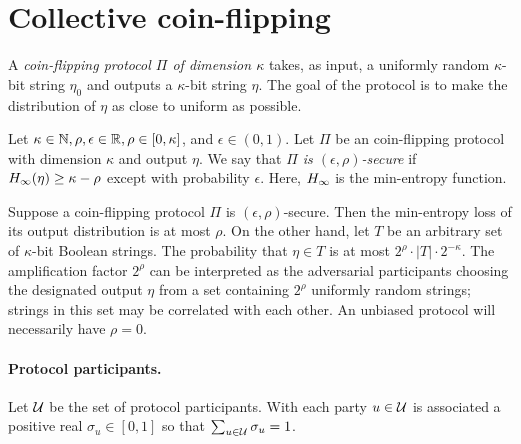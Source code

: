 
\newcommand{\FuncBeacon}{\mathcal{F}_\mathsf{beacon}}
\newcommand{\ProtocolBeacon}{\mathcal{\Pi}_\mathsf{beacon}}




\section{Collective coin-flipping}

    A \emph{coin-flipping protocol $\Pi$ of dimension $\kappa$} 
    takes, as input, a uniformly random $\kappa$-bit string $\eta_0$
    and outputs a $\kappa$-bit string $\eta$. 
    The goal of the protocol is to make the distribution of $\eta$ 
    as close to uniform as possible.
    
    \begin{definition}\label{def:coin-flipping-security}
        Let $\kappa \in \mathbb{N}, \rho, \epsilon \in \mathbb{R}, \rho \in [0, \kappa]$, and $\epsilon \in (0,1)$.
        Let $\Pi$ be an coin-flipping protocol with dimension $\kappa$ 
        and output $\eta$. 
        We say that \emph{$\Pi$ is $(\epsilon, \rho)$-secure} if 
        $H_\infty(\eta) \geq \kappa - \rho$ 
        except with probability $\epsilon$. 
        Here, $H_\infty$ is the min-entropy function.
    \end{definition}
    
    Suppose a coin-flipping protocol $\Pi$ is $(\epsilon, \rho)$-secure. 
    Then 
    the min-entropy loss of its output distribution is at most $\rho$. 
    On the other hand, let $T$ be an arbitrary set of $\kappa$-bit Boolean strings. 
    The probability that $\eta \in T$ is at most $2^\rho \cdot |T| \cdot 2^{-\kappa}$. 
    The amplification factor $2^\rho$ can be interpreted as 
    the adversarial participants 
    choosing the designated output $\eta$ from 
    a set containing $2^\rho$ uniformly random strings; 
    {\color{red} strings in this set may be correlated with each other}. 
    An unbiased protocol will necessarily have $\rho = 0$.


    \paragraph{Protocol participants.} 
    Let $\mathcal{U}$ be the set of protocol participants. 
    With each party $u \in \mathcal{U}$ is associated a positive real $\sigma_u \in [0, 1]$ 
    so that $\sum_{u \in \mathcal{U}} \sigma_u = 1$. 

